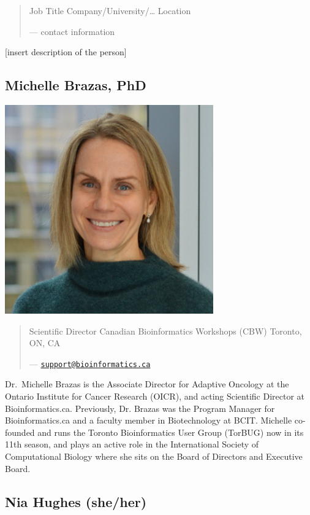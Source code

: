 \documentclass[
]{book}
\begin{document}
\begin{quote}
Job Title
Company/University/\ldots{}
Location

--- contact information
\end{quote}

{[}insert description of the person{]}

\subsection{Michelle Brazas, PhD}\label{michelle-brazas-phd}

\includegraphics{./img/faculty/michelle-brazas.jpg}\\

\begin{quote}
Scientific Director
Canadian Bioinformatics Workshops (CBW)
Toronto, ON, CA

--- \href{mailto:support@bioinformatics.ca}{\nolinkurl{support@bioinformatics.ca}}
\end{quote}

Dr.~Michelle Brazas is the Associate Director for Adaptive Oncology at the Ontario Institute for
Cancer Research (OICR), and acting Scientific Director at Bioinformatics.ca. Previously, Dr.
Brazas was the Program Manager for Bioinformatics.ca and a faculty member in
Biotechnology at BCIT. Michelle co-founded and runs the Toronto Bioinformatics User Group
(TorBUG) now in its 11th season, and plays an active role in the International Society of
Computational Biology where she sits on the Board of Directors and Executive Board.

\subsection{Nia Hughes (she/her)}\label{nia-hughes-sheher}
\end{document}
